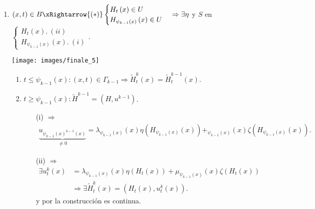 \begin{demo}
\begin{enumerate}
    \item $\left( x, t \right) \in B \xRightarrow{(*)} \begin{cases}
        H_t\left( x \right) \in U\\
        H_{\psi_{k - 1} \left( x \right)} \left( x \right) \in U
    \end{cases} \Rightarrow \exists \eta$ y $S$ en $\begin{cases}
        H_t\left( x \right).\ (ii)\\
        H_{\psi_{k - 1} \left( x \right)} \left( x \right).\ (i)
    \end{cases}$.
    \begin{center}
        \texttt{[image: images/finale\_5]} 
    \end{center}
    \begin{enumerate}
        \item $t \le \psi_{k - 1} \left( x \right) : \left( x, t \right) \in \Gamma_{k - 1} \Rightarrow \tilde{H}_t^k \left( x \right) = \tilde{H}_t^{k - 1} \left( x \right)$.
        \item $t \ge \psi_{k - 1} \left( x \right) : \tilde{H}^{k - 1} = \left( H, u^{k - 1} \right)$.
        \begin{enumerate}
            \item[(i)] $\Rightarrow$
            \begin{align*}
            \underbrace{u_{\psi_{k-1} \left( x \right)^{k - 1} \left( x \right)}}_{\neq 0} = \lambda_{\psi_{k - 1} \left( x \right)} \left( x \right) \eta\left( H_{\psi_{k - 1}\left( x \right)} \left( x \right) \right) + _{\psi_{k - 1} \left( x \right)} \left( x \right) \zeta\left( H_{\psi_{k - 1}\left( x \right)} \left( x \right) \right) 
            .\end{align*}
            \item[(ii)] $\Rightarrow$
            \begin{align*}
                \exists u_t^k\left( x \right) &= \lambda_{\psi_{k-1}\left( x \right)} \left( x \right) \eta\left( H_t\left( x \right) \right) + \mu_{\psi_{k - 1} \left( x \right)} \left( x \right) \zeta\left( H_t\left( x \right) \right) \\
                &\Rightarrow \exists \tilde{H}_t^k\left( x \right) = \left( H_t\left( x \right), u_t^k\left( x \right) \right)
            .\end{align*}
            y por la construcción es continua.
        \end{enumerate}


\end{enumerate}
\end{enumerate}
\end{demo}
